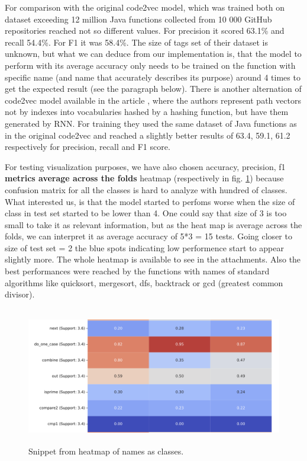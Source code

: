 \documentclass[10pt,english,a4paper]{report}
\begin{document}
For comparison with the original code2vec model, which was trained both on dataset exceeding 12 million Java functions
collected from 10 000 GitHub repositories reached not so different values. For precision it scored 63.1\% and recall 54.4\%.
For F1 it was 58.4\%. The size of tags set of their dataset is unknown, but what we can deduce from our 
implementation is, that the model to perform with its average accuracy only needs to be trained on the function with 
specific name (and name that accurately describes its purpose) around 4 times to get the expected result (see the paragraph below).
There is another alternation of code2vec model available in the article \cite{improved_rnn}, where the authors represent 
path vectors not by indexes into vocabularies hashed by a hashing function, but have them generated by RNN. For training they
used the same dataset of Java functions as in the original code2vec and reached a slightly better results
of 63.4, 59.1, 61.2 respectively for precision, recall and F1 score.

For testing visualization purposes, we have also chosen accuracy, precision, f1 \textbf{metrics average across the folds} heatmap (respectively in fig. \ref{fig:heatmap_snippet}) because 
confusion matrix for all the classes is hard to analyze with hundred of classes. What interested us,
is that the model started to perfoms worse  when the size of class in test set started to be lower than 4. 
One could say that size of 3 is too small to take it as relevant information, but as the heat map is average
across the folds, we can interpret it as average accuracy of 5*3 = 15 tests. Going closer to size of test set = 2
the blue spots indicating low performence start to appear slightly more. The whole heatmap is available to see in the attachments. Also the best
performances were reached by the functions with names of standard algorithms like quicksort, mergesort, dfs, backtrack or gcd (greatest common divisor). 


\begin{figure}[H]
    \centering
    \includegraphics[width=16cm, height=6cm]{figures/heatmap_snippet.png}
    \caption{Snippet from heatmap of names as classes.}
    \label{fig:heatmap_snippet}
\end{figure}
\end{document}

